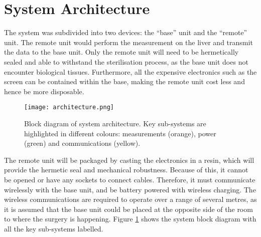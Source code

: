 \section{System Architecture}

The system was subdivided into two devices: the ``base'' unit and the ``remote'' unit. The remote unit would perform the measurement on the liver and transmit the data to the base unit. Only the remote unit will need to be hermetically sealed and able to withstand the sterilisation process, as the base unit does not encounter biological tissues. Furthermore, all the expensive electronics such as the screen can be contained within the base, making the remote unit cost less and hence be more disposable.\\

\begin{figure}[htbp]
	\centering
	\texttt{[image: architecture.png]}
	\caption{Block diagram of system architecture. Key sub-systems are highlighted in different colours: measurements (orange), power (green) and communications (yellow).}
	\label{fig: architecture}
\end{figure}

The remote unit will be packaged by casting the electronics in a resin, which will provide the hermetic seal and mechanical robustness. Because of this, it cannot be opened or have any sockets to connect cables. Therefore, it must communicate wirelessly with the base unit, and be battery powered with wireless charging. The wireless communications are required to operate over a range of several metres, as it is assumed that the base unit could be placed at the opposite side of the room to where the surgery is happening. Figure \ref{fig: architecture} shows the system block diagram with all the key sub-systems labelled.